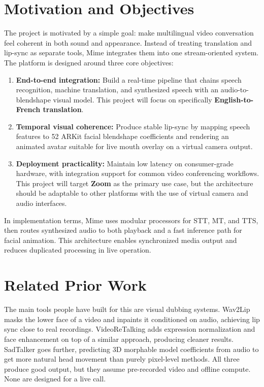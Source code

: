 \section{Motivation and Objectives}

The project is motivated by a simple goal: make multilingual video conversation feel coherent in both sound and appearance. Instead of treating translation and lip-sync as separate tools, Mime integrates them into one stream-oriented system. The platform is designed around three core objectives:

\begin{enumerate}
    \item \textbf{End-to-end integration:} Build a real-time pipeline that chains speech recognition, machine translation, and synthesized speech with an audio-to-blendshape visual model. This project will focus on specifically \textbf{English-to-French translation}.
    \item \textbf{Temporal visual coherence:} Produce stable lip-sync by mapping speech features to 52 ARKit facial blendshape coefficients and rendering an animated avatar suitable for live mouth overlay on a virtual camera output.
    \item \textbf{Deployment practicality:} Maintain low latency on consumer-grade hardware, with integration support for common video conferencing workflows. This project will target \textbf{Zoom} as the primary use case, but the architecture should be adaptable to other platforms with the use of virtual camera and audio interfaces.
\end{enumerate}

In implementation terms, Mime uses modular processors for STT, MT, and TTS, then routes synthesized audio to both playback and a fast inference path for facial animation. This architecture enables synchronized media output and reduces duplicated processing in live operation.

\section{Related Prior Work}

The main tools people have built for this are visual dubbing systems. Wav2Lip \cite{prajwal2020wav2lip} masks the lower face of a video and inpaints it conditioned on audio, achieving lip sync close to real recordings. VideoReTalking \cite{cheng2022videoretalking} adds expression normalization and face enhancement on top of a similar approach, producing cleaner results. SadTalker \cite{zhang2023sadtalker} goes further, predicting 3D morphable model coefficients from audio to get more natural head movement than purely pixel-level methods. All three produce good output, but they assume pre-recorded video and offline compute. None are designed for a live call.

